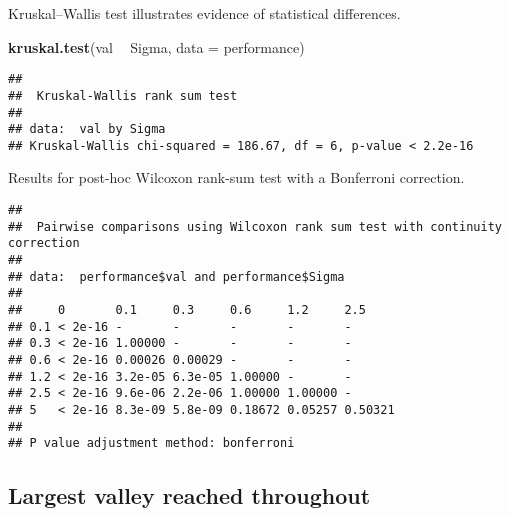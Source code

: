 \documentclass[]{book}
\newenvironment{Shaded}{\begin{snugshade}}{\end{snugshade}}
\newcommand{\DataTypeTok}[1]{\textcolor[rgb]{0.13,0.29,0.53}{#1}}
\newcommand{\KeywordTok}[1]{\textcolor[rgb]{0.13,0.29,0.53}{\textbf{#1}}}
\newcommand{\NormalTok}[1]{#1}
\newcommand{\OperatorTok}[1]{\textcolor[rgb]{0.81,0.36,0.00}{\textbf{#1}}}
\newcommand{\OtherTok}[1]{\textcolor[rgb]{0.56,0.35,0.01}{#1}}
\newcommand{\StringTok}[1]{\textcolor[rgb]{0.31,0.60,0.02}{#1}}
\begin{document}
Kruskal--Wallis test illustrates evidence of statistical differences.

\begin{Shaded}
\begin{Highlighting}[]
\KeywordTok{kruskal.test}\NormalTok{(val }\OperatorTok{~}\StringTok{ }\NormalTok{Sigma, }\DataTypeTok{data =}\NormalTok{ performance)}
\end{Highlighting}
\end{Shaded}

\begin{verbatim}
## 
##  Kruskal-Wallis rank sum test
## 
## data:  val by Sigma
## Kruskal-Wallis chi-squared = 186.67, df = 6, p-value < 2.2e-16
\end{verbatim}

Results for post-hoc Wilcoxon rank-sum test with a Bonferroni correction.

\begin{Shaded}
\end{Shaded}

\begin{verbatim}
## 
##  Pairwise comparisons using Wilcoxon rank sum test with continuity correction 
## 
## data:  performance$val and performance$Sigma 
## 
##     0       0.1     0.3     0.6     1.2     2.5    
## 0.1 < 2e-16 -       -       -       -       -      
## 0.3 < 2e-16 1.00000 -       -       -       -      
## 0.6 < 2e-16 0.00026 0.00029 -       -       -      
## 1.2 < 2e-16 3.2e-05 6.3e-05 1.00000 -       -      
## 2.5 < 2e-16 9.6e-06 2.2e-06 1.00000 1.00000 -      
## 5   < 2e-16 8.3e-09 5.8e-09 0.18672 0.05257 0.50321
## 
## P value adjustment method: bonferroni
\end{verbatim}

\hypertarget{largest-valley-reached-throughout-19}{%
\subsection{Largest valley reached throughout}\label{largest-valley-reached-throughout-19}}
\end{document}
